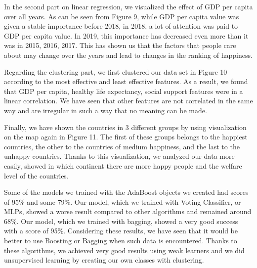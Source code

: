 \documentclass[onecolumn]{article}
\begin{document}
In the second part on linear regression, we visualized the effect of GDP per capita over all years. As can be seen from Figure 9, while GDP per capita value was given a stable importance before 2018, in 2018, a lot of attention was paid to GDP per capita value. In 2019, this importance has decreased even more than it was in 2015, 2016, 2017. This has shown us that the factors that people care about may change over the years and lead to changes in the ranking of happiness.

Regarding the clustering part, we first clustered our data set in Figure 10 according to the most effective and least effective features. As a result, we found that GDP per capita, healthy life expectancy, social support features were in a linear correlation. We have seen that other features are not correlated in the same way and are irregular in such a way that no meaning can be made.

Finally, we have shown the countries in 3 different groups by using visualization on the map again in Figure 11. The first of these groups belongs to the happiest countries, the other to the countries of medium happiness, and the last to the unhappy countries.
Thanks to this visualization, we analyzed our data more easily, showed in which continent there are more happy people and the welfare level of the countries.

Some of the models we trained with the AdaBoost objects we created had scores of 95\% and some 79\%. Our model, which we trained with Voting Classifier, or MLPs, showed a worse result compared to other algorithms and remained around 68\%. Our model, which we trained with bagging, showed a very good success with a score of 95\%.
Considering these results, we have seen that it would be better to use Boosting or Bagging when such data is encountered. Thanks to these algorithms, we achieved very good results using weak learners and we did unsupervised learning by creating our own classes with clustering.

\nocite{*}
\end{document}
